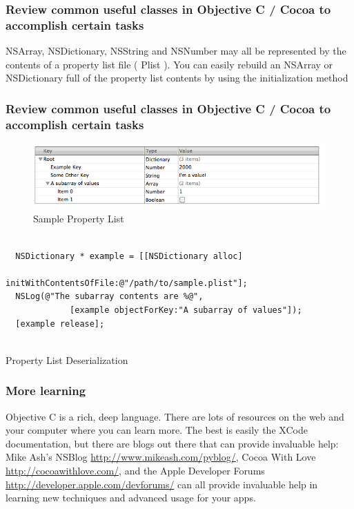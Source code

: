 \documentclass[10pt]{beamer}
\begin{document}
\begin{frame}[fragile]
  \frametitle{Review common useful classes in Objective C / Cocoa to accomplish certain tasks}
  NSArray, NSDictionary, NSString and NSNumber may all be represented by the contents of a property list file ( Plist ).  You can easily rebuild an NSArray or NSDictionary full of the property list contents by using the initialization method 

\end{frame}

\begin{frame}[fragile]
  \frametitle{Review common useful classes in Objective C / Cocoa to accomplish certain tasks}
  \begin{figure}[htb]
  \begin{center}
  
  \includegraphics[scale=0.5]{PListExample1.png}
              
  \caption{Sample Property List}
  \end{center}
  \end{figure}

\begin{listing}[H]
    \begin{verbatim}
  
  NSDictionary * example = [[NSDictionary alloc]
                               initWithContentsOfFile:@"/path/to/sample.plist"];
  NSLog(@"The subarray contents are %@",
             [example objectForKey:"A subarray of values"]);
  [example release];
              
  \end{verbatim}
    \caption{Property List Deserialization}
    \label{listing:24}
  \end{listing}

\end{frame}

    
\begin{frame}[fragile]
  \frametitle{More learning}
  Objective C is a rich, deep language.  There are lots of resources on the web and your computer where you can learn more. The best is easily the XCode documentation, but there are blogs out there that can provide invaluable help: Mike Ash's NSBlog \url{http://www.mikeash.com/pyblog/},  Cocoa With Love \url{http://cocoawithlove.com/}, and the Apple Developer Forums \url{http://developer.apple.com/devforums/} can all provide invaluable help in learning new techniques and advanced usage for your apps.

\end{frame}
\end{document}
